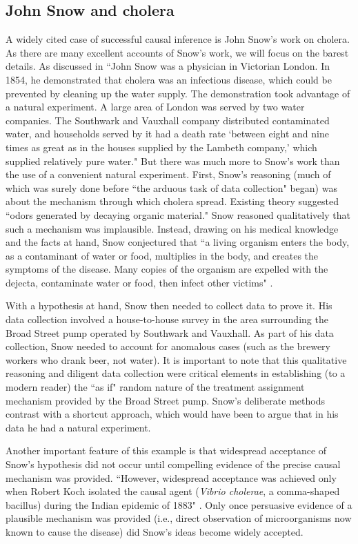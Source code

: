 \documentclass[12pt,reqno,titlepage]{amsart}
\theoremstyle{definition}
\begin{document}
\begin{doublespace}
\subsection{John Snow and cholera}
A widely cited case of successful causal inference is John Snow's work on cholera. 
As there are many excellent accounts of Snow's work, we will focus on the barest details.
As discussed in \citet[p.\,339]{Freedman:2009ur} ``John Snow was a physician in Victorian London. In 1854, he demonstrated that cholera was an infectious disease, which could be prevented by cleaning up the water supply. The demonstration took advantage of a natural experiment. A large area of London was served by two water companies. The Southwark and Vauxhall company distributed contaminated water, and households served by it had a death rate `between eight and nine times as great as in the houses supplied by the Lambeth company,' which supplied relatively pure water."
But there was much more to Snow's work than the use of a convenient natural experiment. 
First, Snow's reasoning (much of which was surely done before ``the arduous task of data collection" began) was about the mechanism through which cholera spread. Existing theory suggested ``odors generated by decaying organic material." 
Snow reasoned qualitatively that such a mechanism was implausible.
Instead, drawing on his medical knowledge and the facts at hand, Snow conjectured that ``a living organism enters the body, as a contaminant of water or food, multiplies in the body, and creates the symptoms of the disease. 
Many copies of the organism are expelled with the dejecta, contaminate water or food, then infect other victims" \citep[p.\,342]{Freedman:2009ur}.
 
With a hypothesis at hand, Snow then needed to collect data to prove it. 
His data collection involved a house-to-house survey in the area surrounding the Broad Street pump operated by Southwark and Vauxhall.
As part of his data collection, Snow needed to account for anomalous cases (such as the brewery workers who drank beer, not water).
It is important to note that this qualitative reasoning and diligent data collection were critical elements in establishing (to a modern reader) the ``as if" random nature of the treatment assignment mechanism provided by the Broad Street pump. 
Snow's deliberate methods contrast with a shortcut approach, which would have been to argue that in his data he had a natural experiment. 
 
Another important feature of this example is that widespread acceptance of Snow's hypothesis did not occur until compelling evidence of the precise causal mechanism was provided. 
 ``However, widespread acceptance was achieved only when Robert Koch isolated the causal agent (\emph{Vibrio cholerae}, a comma-shaped bacillus) during the Indian epidemic of 1883" \citep[p. 342]{Freedman:2009ur}.
 Only once persuasive evidence of a plausible mechanism was provided (i.e., direct observation of microorganisms now known to cause the disease) did Snow's ideas become widely accepted. 
 

\end{doublespace}
\end{document}
